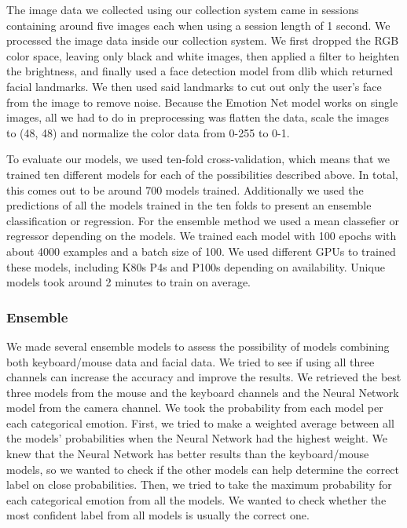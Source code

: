 \documentclass[../main.tex]{subfiles}
\begin{document}
    The image data we collected using our collection system came in sessions containing around five images each when using a session length of 1 second. 
    We processed the image data inside our collection system. We first dropped the RGB color space, leaving only black and white images, 
    then applied a filter to heighten the brightness, and finally used a face detection model from dlib \cite{dlib} which returned facial landmarks. 
    We then used said landmarks to cut out only the user's face from the image to remove noise. Because the Emotion Net model works on single images, 
    all we had to do in preprocessing was flatten the data, scale the images to (48, 48) and normalize the color data from 0-255 to 0-1.

    To evaluate our models, we used ten-fold cross-validation, which means that we trained ten different models for each of 
    the possibilities described above. In total, this comes out to be around 700 models trained. Additionally we used the predictions
    of all the models trained in the ten folds to present an ensemble classification or regression. For the ensemble method we used a 
    mean classefier or regressor depending on the models. 
    We trained each model with 100 epochs with about 4000 examples and a batch size of 100. We used different GPUs to trained these models, 
    including K80s P4s and P100s depending on availability. Unique models took around 2 minutes to train on average.

    \subsubsection{Ensemble} \label{section:methodology_ensemble}
    We made several ensemble models to assess the possibility of models combining both keyboard/mouse data and facial data. 
    We tried to see if using all three channels can increase the accuracy and improve the results. We retrieved the best three models from the 
    mouse and the keyboard channels and the Neural Network model from the camera channel. We took the probability from each model per each categorical emotion. 
    First, we tried to make a weighted average between all the models' probabilities when the Neural Network had the highest weight. 
    We knew that the Neural Network has better results than the keyboard/mouse models,
    so we wanted to check if the other models can help determine the correct label on close probabilities. 
    Then, we tried to take the maximum probability for each categorical emotion from all the models. We wanted to check whether the 
    most confident label from all models is usually the correct one.
\end{document}
